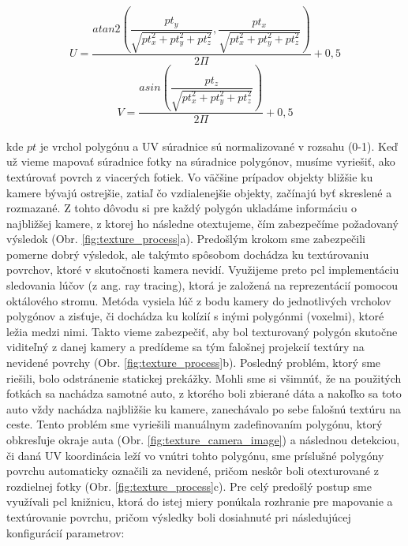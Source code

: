 \begin{equation}
  U = \frac{atan2\left(\dfrac{pt_y}{\sqrt{pt_x^2 + pt_y^2 + pt_z^2}} , \dfrac{pt_x}{\sqrt{pt_x^2 + pt_y^2 + pt_z^2}}\right)} {2\Pi} + 0,5
  \label{eq:texturing2}
\end{equation}
\begin{equation}
  V = \frac{asin\left(\dfrac{pt_z}{\sqrt{pt_x^2 + pt_y^2 + pt_z^2}}\right)} {2\Pi} + 0,5
  \label{eq:texturing3}
\end{equation} 
\\
\noindent kde $pt$ je vrchol polygónu a UV súradnice sú normalizované v rozsahu (0-1).
\newline\indent Keď už vieme mapovať súradnice fotky na súradnice polygónov, musíme vyriešiť, ako textúrovať povrch z viacerých fotiek. Vo väčšine prípadov objekty bližšie ku kamere bývajú ostrejšie, zatiaľ čo vzdialenejšie objekty, začínajú byť skreslené a rozmazané. Z tohto dôvodu si pre každý polygón ukladáme informáciu o najbližšej kamere, z ktorej ho následne otextujeme, čím zabezpečíme požadovaný výsledok (Obr. \ref{fig:texture_process}a).
\newline\indent Predošlým krokom sme zabezpečili pomerne dobrý výsledok, ale takýmto spôsobom dochádza ku textúrovaniu povrchov, ktoré v skutočnosti kamera nevidí. Využijeme preto \acrshort{pcl} implementáciu sledovania lúčov (z ang. ray tracing), ktorá je založená na reprezentácií pomocou oktálového stromu. Metóda vysiela lúč z bodu kamery do jednotlivých vrcholov polygónov a zisťuje, či dochádza ku kolízií s inými polygónmi (voxelmi), ktoré ležia medzi nimi. Takto vieme zabezpečiť, aby bol texturovaný polygón skutočne viditeľný z danej kamery a predídeme sa tým falošnej projekcií textúry na nevidené povrchy (Obr. \ref{fig:texture_process}b).
\newline\indent Posledný problém, ktorý sme riešili, bolo odstránenie statickej prekážky. Mohli sme si všimnúť, že na použitých fotkách sa nachádza samotné auto, z ktorého boli zbierané dáta a nakoľko sa toto auto vždy nachádza najbližšie ku kamere, zanechávalo po sebe falošnú textúru na ceste. Tento problém sme vyriešili manuálnym zadefinovaním polygónu, ktorý obkresľuje okraje auta (Obr. \ref{fig:texture_camera_image}) a následnou detekciou, či daná UV koordinácia leží vo vnútri tohto polygónu, sme príslušné polygóny povrchu automaticky označili za nevidené, pričom neskôr boli otexturované z rozdielnej fotky (Obr. \ref{fig:texture_process}c).
\newline\indent Pre celý predošlý postup sme využívali \acrshort{pcl} knižnicu, ktorá do istej miery ponúkala rozhranie pre mapovanie a textúrovanie povrchu, pričom výsledky boli dosiahnuté pri následujúcej konfigurácií parametrov:


